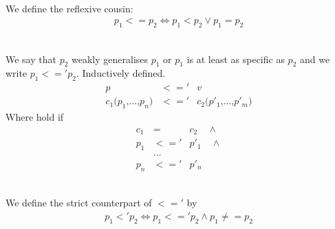 \begin{definition}[Total ordering, $<=$]\ \\
  \label{def:pat-total-order-weak}
  We define the reflexive cousin:
  \begin{eqnarray*}
    p_1 <= p_2 \Longleftrightarrow p_1 < p_2 \lor p_1 = p_2
  \end{eqnarray*}
\end{definition}



\begin{definition}[Partial ordering, $<='$]\ \\
  \label{def:pat-partial-order-weak}
  We say that $p_2$ weakly generalises $p_1$ or $p_1$ is at least as specific as
  $p_2$ and we write $p_1 <=' p_2$. Inductively defined.
  \begin{eqnarray}
    p &<='& v \label{eq:pat-partial-order-weak-var}\\
    c_1\texttt{(}p_1\texttt{,} \ldots\texttt{,} p_n\texttt{)} &<='&
    c_2\texttt{(}p'_1\texttt{,} \ldots\texttt{,} p'_m\texttt{)}
    \label{eq:pat-partial-order-weak-con}
  \end{eqnarray}
  Where  hold if
  \begin{eqnarray*}
    c_1 &=& c_2 \quad \land\\
    p_1 &<='& p'_1 \quad \land\\
    &\ldots&\\
    p_n &<='& p'_n
  \end{eqnarray*}
\end{definition}



\begin{definition}\ \\
  \label{def:pat-partial-order-strict}
  We define the strict counterpart of $<='$ by
  \begin{eqnarray*}
      p_1 <' p_2 \Longleftrightarrow p_1 <=' p_2 \land p_1 \not == p_2
  \end{eqnarray*}
\end{definition}

